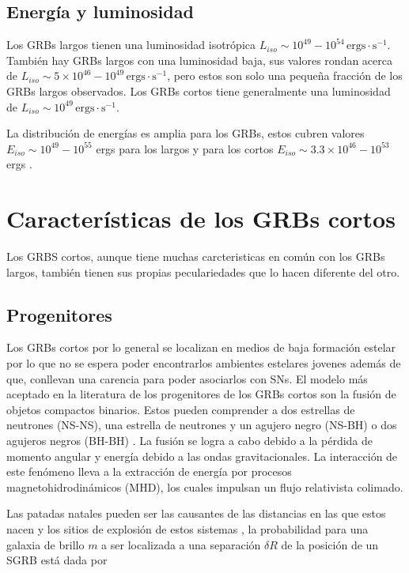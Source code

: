 \documentclass[12pt,a4paper]{book}
\begin{document}
\subsection{Energía y luminosidad}
Los GRBs largos tienen una luminosidad isotrópica $L_{iso} \sim 10^{49}-10^{54} \, \mathrm{ergs} \cdot \mathrm{s}^{-1}$. También  hay GRBs largos con una luminosidad baja, sus valores rondan acerca de $L_{iso} \sim 5 \times 10^{46}-10^{49} \, \mathrm{ergs} \cdot \mathrm{s}^{-1}$, pero estos son solo una pequeña fracción de los GRBs largos observados. Los GRBs cortos tiene generalmente una luminosidad de $L_{iso} \sim 10^{49} \, \mathrm{ergs} \cdot \mathrm{s}^{-1}$.

La distribución de energías es amplia para los GRBs, estos cubren valores $E_{iso} \sim 10^{49}-10^{55}$ ergs para los largos y para los cortos $E_{iso} \sim 3.3 \times 10^{46}-10^{53}$ ergs \cite{Zhang:PGRB}. %

%
\section{Características de los GRBs cortos}
Los GRBS cortos, aunque tiene muchas carcteristicas en común con los GRBs largos, también tienen sus propias peculariedades que lo hacen diferente del otro.

\subsection{Progenitores} %
Los GRBs cortos por lo general se localizan en medios de baja formación estelar por lo que no se espera poder encontrarlos ambientes estelares jovenes además de que, conllevan una carencia para poder asociarlos con SNs. El modelo más aceptado en la literatura de los progenitores de los GRBs cortos son la fusión de objetos compactos binarios. Estos pueden comprender a dos estrellas de neutrones (NS-NS), una estrella de neutrones y un agujero negro (NS-BH) o dos agujeros negros (BH-BH) \cite{GRB-SE}. La fusión se logra a cabo debido a la pérdida de momento angular y energía debido a las ondas gravitacionales. La interacción de este fenómeno lleva a la extracción de energía por procesos magnetohidrodinámicos (MHD), los cuales impulsan un flujo relativista colimado. 

Las patadas natales pueden ser las causantes de las distancias en las que estos nacen y los sitios de explosión de estos sistemas \cite{Berger:2013jza}, la probabilidad para una galaxia de brillo $m$  a ser localizada a una separación $\delta R$ de la posición de un SGRB está dada por 
\end{document}
